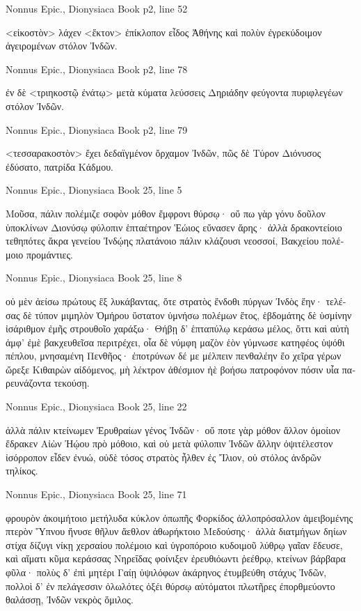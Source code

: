 \documentclass[12pt,letterpaper,twoside,final]{memoir}
\begin{document}
\begin{greek}
Nonnus Epic., Dionysiaca 
Book p2, line 52

<εἰκοστὸν> λάχεν <ἕκτον> ἐπίκλοπον εἶδος Ἀθήνης 
καὶ πολὺν ἐγρεκύδοιμον ἀγειρομένων στόλον Ἰνδῶν. 



Nonnus Epic., Dionysiaca 
Book p2, line 78

ἐν δὲ <τριηκοστῷ ἐνάτῳ> μετὰ κύματα λεύσσεις 
Δηριάδην φεύγοντα πυριφλεγέων στόλον Ἰνδῶν. 



Nonnus Epic., Dionysiaca 
Book p2, line 79

<τεσσαρακοστὸν> ἔχει δεδαϊγμένον ὄρχαμον Ἰνδῶν, 
πῶς δὲ Τύρον Διόνυσος ἐδύσατο, πατρίδα Κάδμου. 



Nonnus Epic., Dionysiaca 
Book 25, line 5

Μοῦσα, πάλιν πολέμιζε σοφὸν μόθον ἔμφρονι θύρσῳ· 
οὔ πω γὰρ γόνυ δοῦλον ὑποκλίνων Διονύσῳ 
φύλοπιν ἑπταέτηρον Ἑώιος εὔνασεν ἄρης· 
ἀλλὰ δρακοντείοιο τεθηπότες ἄκρα γενείου 
Ἰνδῴης πλατάνοιο πάλιν κλάζουσι νεοσσοί, 
Βακχείου πολέμοιο προμάντιες. 



Nonnus Epic., Dionysiaca 
Book 25, line 8

                                  οὐ μὲν ἀείσω 
πρώτους ἓξ λυκάβαντας, ὅτε στρατὸς ἔνδοθι πύργων 
Ἰνδὸς ἔην· τελέσας δὲ τύπον μιμηλὸν Ὁμήρου 
ὕστατον ὑμνήσω πολέμων ἔτος, ἑβδομάτης δὲ 
ὑσμίνην ἰσάριθμον ἐμῆς στρουθοῖο χαράξω· 
Θήβῃ δ' ἑπταπύλῳ κεράσω μέλος, ὅττι καὶ αὐτὴ 
ἀμφ' ἐμὲ βακχευθεῖσα περιτρέχει, οἷα δὲ νύμφη 
μαζὸν ἑὸν γύμνωσε κατηφέος ὑψόθι πέπλου, 
μνησαμένη Πενθῆος· ἐποτρύνων δέ με μέλπειν 
πενθαλέην ἕο χεῖρα γέρων ὤρεξε Κιθαιρὼν 
αἰδόμενος, μὴ λέκτρον ἀθέσμιον ἠὲ βοήσω 
πατροφόνον πόσιν υἷα παρευνάζοντα τεκούσῃ. 



Nonnus Epic., Dionysiaca 
Book 25, line 22

ἀλλὰ πάλιν κτείνωμεν Ἐρυθραίων γένος Ἰνδῶν· 
οὔ ποτε γὰρ μόθον ἄλλον ὁμοίιον ἔδρακεν Αἰὼν 
Ἠῴου πρὸ μόθοιο, καὶ οὐ μετὰ φύλοπιν Ἰνδῶν 
ἄλλην ὀψιτέλεστον ἰσόρροπον εἶδεν ἐνυώ, 
οὐδὲ τόσος στρατὸς ἦλθεν ἐς Ἴλιον, οὐ στόλος ἀνδρῶν 
τηλίκος. 



Nonnus Epic., Dionysiaca 
Book 25, line 71

φρουρὸν ἀκοιμήτοιο μετήλυδα κύκλον ὀπωπῆς 
Φορκίδος ἀλλοπρόσαλλον ἀμειβομένης πτερὸν Ὕπνου 
ἤνυσε θῆλυν ἄεθλον ἀθωρήκτοιο Μεδούσης· 
ἀλλὰ διατμήγων δηίων στίχα δίζυγι νίκῃ 
χερσαίου πολέμοιο καὶ ὑγροπόροιο κυδοιμοῦ 
λύθρῳ γαῖαν ἔδευσε, καὶ αἵματι κῦμα κεράσσας 
Νηρεΐδας φοίνιξεν ἐρευθιόωντι ῥεέθρῳ, 
κτείνων βάρβαρα φῦλα· πολὺς δ' ἐπὶ μητέρι Γαίῃ 
ὑψιλόφων ἀκάρηνος ἐτυμβεύθη στάχυς Ἰνδῶν, 
πολλοὶ δ' ἐν πελάγεσσιν ὀλωλότες ὀξέι θύρσῳ 
αὐτόματοι πλωτῆρες ἐπορθμεύοντο θαλάσσῃ, 
Ἰνδῶν νεκρὸς ὅμιλος. 




\end{greek}
\end{document}
